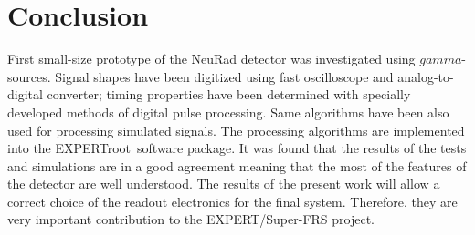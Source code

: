 \documentclass{webofc}
\newcommand{\er}{\textmd{EXPERTroot}}
\begin{document}
	
	
	


\section{Conclusion}
	
	First small-size prototype of the NeuRad detector was investigated using $gamma$-sources. Signal shapes have been digitized using fast oscilloscope and analog-to-digital converter; timing properties have been determined with specially developed methods of digital pulse processing. Same algorithms have been also used for processing simulated signals. The processing algorithms are implemented into the \er\, software package. It was found that the results of the tests and simulations are in a good agreement meaning that the most of the features of the detector are well understood. The results of the present work will allow a correct choice of the readout electronics for the final system. Therefore, they are very important contribution to the EXPERT/Super-FRS project.
	
	
	
	
	
\end{document}
